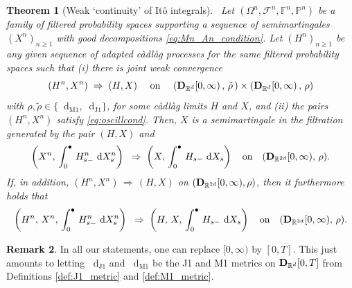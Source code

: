 \documentclass[11pt]{article}
\newtheorem{theorem}{Theorem}[section]
\theoremstyle{definition}\newtheorem{example}[theorem]{Example}
\theoremstyle{definition}\newtheorem{counterexample}[theorem]{Counterexample}
\theoremstyle{definition}\newtheorem{remark}[theorem]{Remark}
\theoremstyle{definition}\newtheorem{defi}[theorem]{Definition}
\numberwithin{equation}{section}
\newcommand{\R}{\mathbb{R}}
\newcommand{\D}{{\bf D}}											%
\newcommand{\F}{\mathbb{F}}											%
\newcommand*\diff{\mathop{}\!\mathrm{d}}								%
\newcommand{\Pro}{\mathbb{P}}										%
\renewcommand{\|}{\; : \, \;}											%
\newcommand{\dJ}{\diff_{\operatorname{J1}}}								%
\newcommand{\dM}{\diff_{\operatorname{M1}}}							%
\begin{document}
\begin{theorem}[Weak `continuity' of It{\^o} integrals] \ \label{thm:3.19}
Let $(\Omega^n, \mathcal{F}^n, \F^n, \Pro^n)$ be a family of filtered probability spaces supporting a sequence of semimartingales $(X^n)_{n\ge 1}$ with good decompositions \eqref{eq:Mn_An_condition}. Let $(H^n)_{n\ge 1}$ be any given sequence of adapted càdlàg processes for the same filtered probability spaces such that (i) there is joint weak convergence
	\begin{equation}\label{eq:joint_conv}
		(H^n,X^n) \; \Rightarrow \; (H,X)  \quad \text{ on } \quad (\D_{\R^d}[0,\infty)\, , \, \tilde{\rho}\, )\times (\D_{\R^d}[0,\infty)\, , \,\rho)
	\end{equation}
	with $\rho,\tilde{\rho} \in \{ \dM, \dJ \}$, for some càdlàg limits $H$ and $X$, and (ii) the pairs $(H^n, X^n)$ satisfy \eqref{eq:oscillcond}. Then, $X$ is a semimartingale in the filtration generated by the pair $(H,X)$ and
	\begin{equation}\label{eq:concerted_stoch_int_conv}
		\left( X^n, \, \int_0^\bullet \, H^n_{s-} \, \diff X_s^n \right) \;  \; \Rightarrow \; \left(  X, \, \int_0^\bullet \, H_{s-} \, \diff X_s \right) \quad \text{on} \quad (\D_{\R^{2d}}[0,\infty), \, \rho).
	\end{equation}
	If, in addition, $(H^n,X^n) \, \Rightarrow \, (H,X)$ on $(\D_{\R^{2d}}[0,\infty),\rho)$, then it furthermore holds that
	\begin{equation}\label{eq:conv_together}
		\left(  H^n, \, X^n, \, \int_0^\bullet \, H^n_{s-} \, \diff X_s^n \right) \;  \; \Rightarrow \; \left( H, \, X, \, \int_0^\bullet \, H_{s-} \, \diff X_s \right) \quad \text{on} \quad (\D_{\R^{3d}}[0,\infty), \, \rho).
	\end{equation}
\end{theorem}
\begin{remark}
	In all our statements, one can replace $[0,\infty)$ by $[0,T]$. This just amounts to letting $\dJ$ and $\dM$ be the J1 and M1 metrics on $\D_{\mathbb{R}^{d}}[0,T]$ from Definitions \ref{def:J1_metric} and \ref{def:M1_metric}.
\end{remark}
\end{document}
